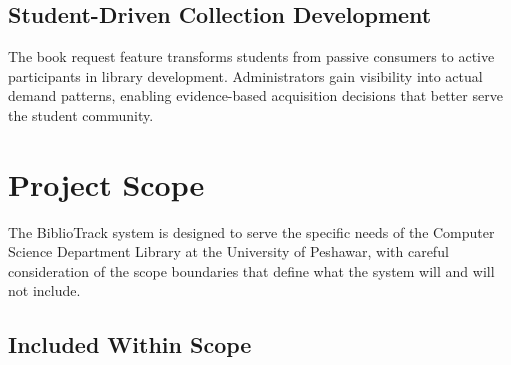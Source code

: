 \documentclass[12pt,a4paper]{report}
\begin{document}
\subsection{Student-Driven Collection Development}

The book request feature transforms students from passive consumers to active participants in library development. Administrators gain visibility into actual demand patterns, enabling evidence-based acquisition decisions that better serve the student community.


\section{Project Scope}
\label{sec:scope}

The BiblioTrack system is designed to serve the specific needs of the Computer Science Department Library at the University of Peshawar, with careful consideration of the scope boundaries that define what the system will and will not include.

\subsection{Included Within Scope}
\end{document}
